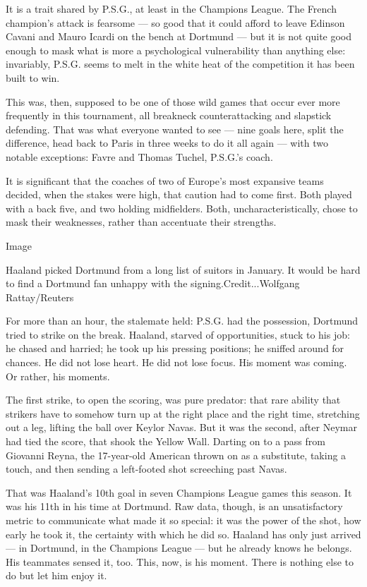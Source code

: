 It is a trait shared by P.S.G., at least in the Champions League. The
French champion's attack is fearsome --- so good that it could afford to
leave Edinson Cavani and Mauro Icardi on the bench at Dortmund --- but
it is not quite good enough to mask what is more a psychological
vulnerability than anything else: invariably, P.S.G. seems to melt in
the white heat of the competition it has been built to win.

This was, then, supposed to be one of those wild games that occur ever
more frequently in this tournament, all breakneck counterattacking and
slapstick defending. That was what everyone wanted to see --- nine goals
here, split the difference, head back to Paris in three weeks to do it
all again --- with two notable exceptions: Favre and Thomas Tuchel,
P.S.G.'s coach.

It is significant that the coaches of two of Europe's most expansive
teams decided, when the stakes were high, that caution had to come
first. Both played with a back five, and two holding midfielders. Both,
uncharacteristically, chose to mask their weaknesses, rather than
accentuate their strengths.

Image

Haaland picked Dortmund from a long list of suitors in January. It would
be hard to find a Dortmund fan unhappy with the
signing.Credit...Wolfgang Rattay/Reuters

For more than an hour, the stalemate held: P.S.G. had the possession,
Dortmund tried to strike on the break. Haaland, starved of
opportunities, stuck to his job: he chased and harried; he took up his
pressing positions; he sniffed around for chances. He did not lose
heart. He did not lose focus. His moment was coming. Or rather, his
moments.

The first strike, to open the scoring, was pure predator: that rare
ability that strikers have to somehow turn up at the right place and the
right time, stretching out a leg, lifting the ball over Keylor Navas.
But it was the second, after Neymar had tied the score, that shook the
Yellow Wall. Darting on to a pass from Giovanni Reyna, the 17-year-old
American thrown on as a substitute, taking a touch, and then sending a
left-footed shot screeching past Navas.

That was Haaland's 10th goal in seven Champions League games this
season. It was his 11th in his time at Dortmund. Raw data, though, is an
unsatisfactory metric to communicate what made it so special: it was the
power of the shot, how early he took it, the certainty with which he did
so. Haaland has only just arrived --- in Dortmund, in the Champions
League --- but he already knows he belongs. His teammates sensed it,
too. This, now, is his moment. There is nothing else to do but let him
enjoy it.

